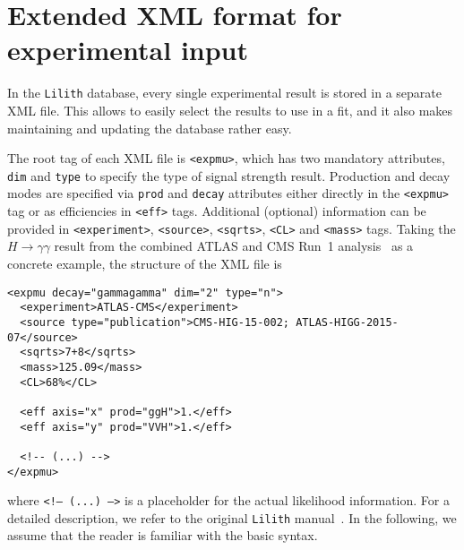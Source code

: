 \clearpage
\section{Extended XML format for experimental input} \label{sec:xml}

In the {\tt Lilith} database, every single experimental result is stored in a separate XML file. 
This allows to easily select the results to use in a fit, and it also makes maintaining and updating the database rather easy. 

The root tag of each XML file is {\tt <expmu>}, which has two mandatory attributes, {\tt dim} and {\tt type} to specify the type of signal strength result. 
Production and decay modes are specified via {\tt prod} and {\tt decay} attributes either directly in the  {\tt <expmu>} tag or as efficiencies in 
{\tt <eff>} tags. Additional (optional) information can be provided in {\tt <experiment>}, {\tt <source>},  {\tt <sqrts>},  {\tt <CL>} and  {\tt <mass>} tags. 
Taking the $H\to\gamma\gamma$ result from the combined ATLAS and CMS Run~1 analysis~\cite{Khachatryan:2016vau} 
as a concrete example, the structure of the XML file is 
 
\begin{verbatim}
<expmu decay="gammagamma" dim="2" type="n">
  <experiment>ATLAS-CMS</experiment>
  <source type="publication">CMS-HIG-15-002; ATLAS-HIGG-2015-07</source>
  <sqrts>7+8</sqrts>
  <mass>125.09</mass>
  <CL>68%</CL> 
  
  <eff axis="x" prod="ggH">1.</eff>
  <eff axis="y" prod="VVH">1.</eff>
  
  <!-- (...) -->
</expmu>
\end{verbatim}

\noindent 
where {\tt <!-- (...) -->} is a placeholder for the actual likelihood information. 
For a detailed description, we refer to the original {\tt Lilith} manual~\cite{Bernon:2015hsa}. 
In the following, we assume that the reader is familiar with the basic syntax. 

